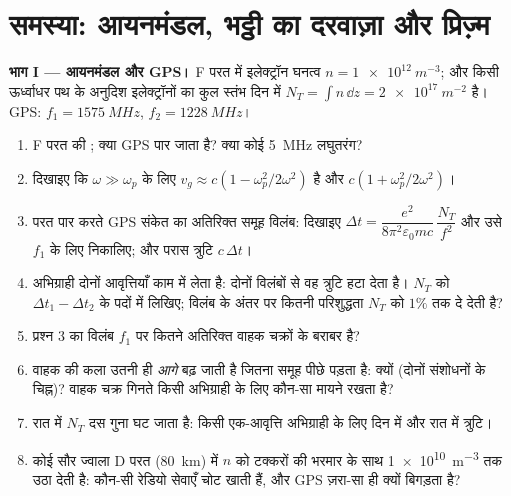 \section{समस्या: आयनमंडल, भट्ठी का दरवाज़ा और प्रिज़्म}

\begin{problem}
\label{pb:b2:waves-in-media:1}

\medskip
\noindent\textbf{भाग I --- आयनमंडल और GPS।}
F परत में इलेक्ट्रॉन घनत्व $n = \qty{1e12}{m^{-3}}$; और किसी ऊर्ध्वाधर पथ के अनुदिश
इलेक्ट्रॉनों का कुल स्तंभ दिन में $N_T = \int n\,\dd z = \qty{2e17}{m^{-2}}$ है। GPS:
$f_1 = \qty{1575}{MHz}$, $f_2 = \qty{1228}{MHz}$।
\begin{enumerate}
  \item F परत की ; क्या GPS पार जाता है? क्या कोई
        \qty{5}{MHz} लघुतरंग?
  \item दिखाइए कि $\omega \gg \omega_p$ के लिए  $v_g \approx c(1 -
        \omega_p^2/2\omega^2)$ है और  $c(1 + \omega_p^2/2\omega^2)$।
  \item परत पार करते GPS संकेत का अतिरिक्त समूह विलंब: दिखाइए
        $\Delta t = \dfrac{e^2}{8\pi^2\varepsilon_0mc}\,\dfrac{N_T}{f^2}$ और उसे $f_1$ के लिए
        निकालिए; और परास त्रुटि $c\,\Delta t$।
  \item अभिग्राही दोनों आवृत्तियाँ काम में लेता है: दोनों विलंबों से वह
        त्रुटि हटा देता है। $N_T$ को $\Delta t_1 - \Delta t_2$ के पदों में लिखिए;
        विलंब के अंतर पर कितनी परिशुद्धता $N_T$ को $1\%$ तक दे देती है?
  \item प्रश्न 3 का विलंब $f_1$ पर कितने अतिरिक्त वाहक चक्रों के
        बराबर है?
  \item वाहक की कला उतनी ही \emph{आगे} बढ़ जाती है जितना
        समूह पीछे पड़ता है: क्यों (दोनों संशोधनों के चिह्न)? वाहक
        चक्र गिनते किसी अभिग्राही के लिए कौन-सा मायने
        रखता है?
  \item रात में $N_T$ दस गुना घट जाता है: किसी एक-आवृत्ति अभिग्राही के
        लिए दिन में और रात में त्रुटि।
  \item कोई सौर ज्वाला D परत (\qty{80}{km}) में $n$ को टक्करों की भरमार के
        साथ \qty{1e10}{m^{-3}} तक उठा देती है: कौन-सी रेडियो सेवाएँ
        चोट खाती हैं, और GPS ज़रा-सा ही क्यों बिगड़ता है?
\end{enumerate}


\end{problem}
